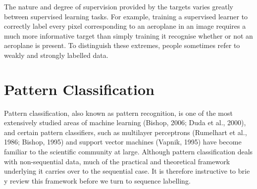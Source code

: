 The nature and degree of supervision provided by the targets varies greatly between supervised learning tasks. For example, training a supervised learner to correctly label every pixel corresponding to an aeroplane in an image requires a much more informative target than simply training it recognise whether or not an aeroplane is present. To distinguish these extremes, people sometimes refer to weakly and strongly labelled data.

\section{Pattern Classification}
Pattern classification, also known as pattern recognition, is one of the most extensively studied areas of machine learning (Bishop, 2006; Duda et al., 2000), and certain pattern classifiers, such as multilayer perceptrons (Rumelhart et al., 1986; Bishop, 1995) and support vector machines (Vapnik, 1995) have become familiar to the scientific community at large. Although pattern classification deals with non-sequential data, much of the practical and theoretical framework underlying it carries over to the sequential case. It is therefore instructive to brie y review this framework before we turn to sequence labelling.
